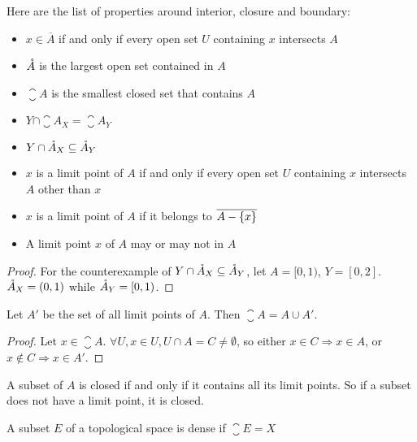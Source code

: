 \begin{theorem}
    Here are the list of properties around interior, closure and boundary:
    \begin{itemize}
        \item $x \in \overline{A}$ if and only if every open set $U$ containing $x$ intersects $A$
        \item $\mathring{A}$ is the largest open set contained in $A$
        \item $\closure{A}$ is the smallest closed set that contains $A$
        \item $Y \cap \closure{A}_X = \closure{A}_Y$
        \item $Y \cap \mathring{A}_X \subseteq \mathring{A}_Y$
        \item $x$ is a limit point of $A$ if and only if every open set $U$ containing $x$ intersects $A$ other than $x$
        \item $x$ is a limit point of $A$ if it belongs to $\overline{A - \set{x}}$
        \item A limit point $x$ of $A$ may or may not in $A$
    \end{itemize}
\end{theorem}
\begin{proof}
    For the counterexample of $Y \cap \mathring{A}_X \subseteq \mathring{A}_Y$, let $A = [0,1)$, $Y = [0,2]$. $\mathring{A}_X = (0,1)$ while $\mathring{A}_Y = [0,1)$.
\end{proof}





\begin{theorem}
    Let $A'$ be the set of all limit points of $A$. Then $\closure{A} = A \cup A'$.
\end{theorem}
\begin{proof}
    Let $x \in \closure{A}$. $\forall U, x \in U, U \cap A = C \neq \emptyset$, so either $x \in C \Rightarrow x \in A$, or $x \notin C \Rightarrow x \in A'$.
\end{proof}

\begin{theorem}
A subset of $A$ is closed if and only if it contains all its limit points. So if a subset does not have a limit point, it is closed.
\end{theorem}


\begin{definition}
    A subset $E$ of a topological space is dense if $\closure{E} = X$
\end{definition}

